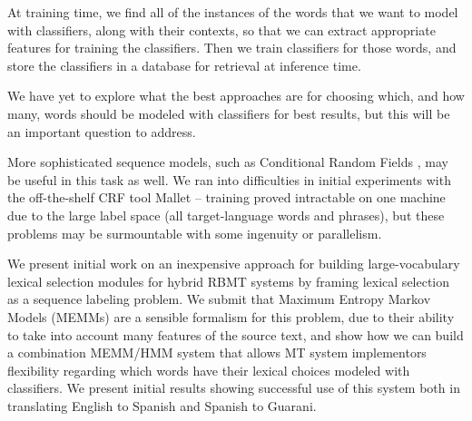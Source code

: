 At training time, we find all of the instances of the words that we want to
model with classifiers, along with their contexts, so that we can extract
appropriate features for training the classifiers. Then we train classifiers
for those words, and store the classifiers in a database for retrieval at
inference time.


We have yet to explore what the best approaches are for choosing which, and how
many, words should be modeled with classifiers for best results, but this will
be an important question to address.

More sophisticated sequence models, such as Conditional Random Fields
\cite{lafferty2001conditional}, may be useful in this task as well. 
We ran into difficulties in initial experiments with the off-the-shelf
CRF tool Mallet \cite{McCallumMALLET} -- training proved intractable on
one machine due to the large label space (all target-language words and
phrases), but these problems may be surmountable with some ingenuity or
parallelism.



We present initial work on an inexpensive approach for building
large-vocabulary lexical selection modules for hybrid RBMT systems by framing
lexical selection as a sequence labeling problem. We submit that Maximum
Entropy Markov Models (MEMMs) are a sensible formalism for this problem, due to
their ability to take into account many features of the source text, and show
how we can build a combination MEMM/HMM system that allows MT system
implementors flexibility regarding which words have their lexical choices
modeled with classifiers. We present initial results showing successful use of
this system both in translating English to Spanish and Spanish to Guarani.

